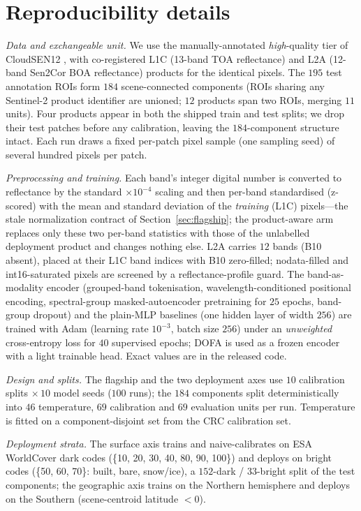 \documentclass[preprint,3p,times]{elsarticle}
\begin{document}
\appendix
\section{Reproducibility details}
\label{app:repro}
\emph{Data and exchangeable unit.} We use the manually-annotated \emph{high}-quality tier of CloudSEN12 \citep{aybar2022cloudsen12}, with co-registered L1C (13-band TOA reflectance) and L2A (12-band Sen2Cor BOA reflectance) products for the identical pixels. The $195$ test annotation ROIs form $184$ scene-connected components (ROIs sharing any Sentinel-2 product identifier are unioned; $12$ products span two ROIs, merging $11$ units). Four products appear in both the shipped train and test splits; we drop their test patches before any calibration, leaving the $184$-component structure intact. Each run draws a fixed per-patch pixel sample (one sampling seed) of several hundred pixels per patch.

\emph{Preprocessing and training.} Each band's integer digital number is converted to reflectance by the standard $\times 10^{-4}$ scaling and then per-band standardised (z-scored) with the mean and standard deviation of the \emph{training} (L1C) pixels---the stale normalization contract of Section~\ref{sec:flagship}; the product-aware arm replaces only these two per-band statistics with those of the unlabelled deployment product and changes nothing else. L2A carries $12$ bands (B10 absent), placed at their L1C band indices with B10 zero-filled; nodata-filled and int16-saturated pixels are screened by a reflectance-profile guard. The band-as-modality encoder (grouped-band tokenisation, wavelength-conditioned positional encoding, spectral-group masked-autoencoder pretraining for $25$ epochs, band-group dropout) and the plain-MLP baselines (one hidden layer of width $256$) are trained with Adam (learning rate $10^{-3}$, batch size $256$) under an \emph{unweighted} cross-entropy loss for $40$ supervised epochs; DOFA is used as a frozen encoder with a light trainable head. Exact values are in the released code.

\emph{Design and splits.} The flagship and the two deployment axes use $10$ calibration splits $\times\,10$ model seeds ($100$ runs); the $184$ components split deterministically into $46$ temperature, $69$ calibration and $69$ evaluation units per run. Temperature is fitted on a component-disjoint set from the CRC calibration set.

\emph{Deployment strata.} The surface axis trains and naive-calibrates on ESA WorldCover \citep{zanaga2021worldcover} dark codes (\{10, 20, 30, 40, 80, 90, 100\}) and deploys on bright codes (\{50, 60, 70\}: built, bare, snow/ice), a $152$-dark / $33$-bright split of the test components; the geographic axis trains on the Northern hemisphere and deploys on the Southern (scene-centroid latitude $<0$).
\end{document}
